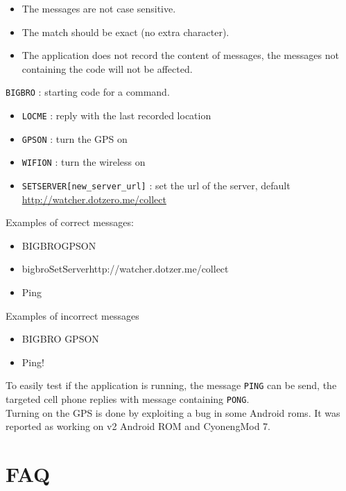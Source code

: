 \begin{itemize}
\item The messages are not case sensitive.
\item The match should be exact (no extra character).
\item The application does not record the content of messages, the messages not containing the code will not be affected.
\end{itemize}

\vspace{0.5cm}
\texttt{BIGBRO} : starting code for a command.
\begin{itemize}
\item \texttt{LOCME} : reply with the last recorded location
\item \texttt{GPSON} : turn the GPS on
\item \texttt{WIFION} : turn the wireless on
\item \texttt{SETSERVER[new\_server\_url]} : set
  the url of the server, default
  \url{http://watcher.dotzero.me/collect}
\end{itemize}

\vspace{0.5cm}
Examples of correct messages:
\begin{itemize}
\item BIGBROGPSON
\item bigbroSetServerhttp://watcher.dotzer.me/collect
\item Ping
\end{itemize}

\vspace{0.5cm}
Examples of incorrect messages
\begin{itemize}
\item BIGBRO GPSON
\item Ping!
\end{itemize}
\vspace{0.5cm}
To easily test if the application is running, the message \texttt{PING} can be send, the targeted cell phone replies with message containing \texttt{PONG}.\\

Turning on the GPS is done by exploiting a bug in some Android roms.
It was reported as working on v2 Android ROM and CyonengMod 7.

\section{FAQ}
\label{sec:faq}

